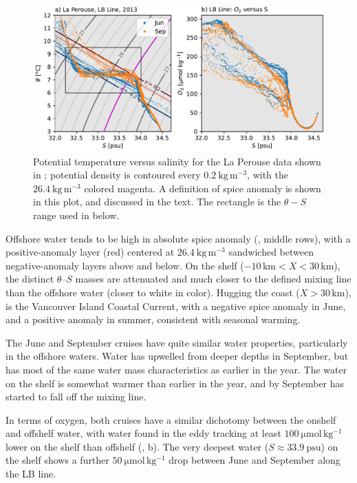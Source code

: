 \documentclass[draft]{agujournal2019}
\begin{document}
\begin{figure}[htbp]
  \begin{center}
     \includegraphics[width=5in]{LaPerouse2013TS}
     \caption{Potential temperature versus salinity for the La Perouse data shown in ; potential density is contoured every $0.2\ \mathrm{kg\,m^{-3}}$, with the $26.4\ \mathrm{kg\,m^{-3}}$ colored magenta. A definition of spice anomaly is shown in this plot, and discussed in the text.  The rectangle is the $\theta-S$ range used in  below.}
     \label{fig:LaPerouse2013TS}
  \end{center}
\end{figure}

Offshore water tends to be high in absolute spice anomaly (, middle rows), with a positive-anomaly layer (red) centered at $26.4\ \mathrm{kg\,m^{-3}}$ sandwiched between negative-anomaly layers above and below.  On the shelf ($-10\, \mathrm{km} < X < 30\, \mathrm{km}$), the distinct $\theta$--$S$ masses are attenuated and much closer to the defined mixing line than the offshore water (closer to white in color).  Hugging the coast ($X > 30\, \mathrm{km}$), is the Vancouver Island Coastal Current, with a negative spice anomaly in June, and a positive anomaly in summer, consistent with seasonal warming.

The June and September cruises have quite similar water properties, particularly in the offshore waters.  Water has upwelled from deeper depths in September, but has most of the same water mass characteristics as earlier in the year.  The water on the shelf is somewhat warmer than earlier in the year, and by September has started to fall off the mixing line.

In terms of oxygen, both cruises have a similar dichotomy between the onshelf and offshelf water, with water found in the eddy tracking at least $100\ \mathrm{\mu mol\, kg^{-1}}$ lower on the shelf than offshelf (, b).  The very deepest water ($S\approx 33.9\ \mathrm{psu}$) on the shelf shows a further $50\ \mathrm{\mu mol\, kg^{-1}}$ drop between June and September along the LB line.
\end{document}
